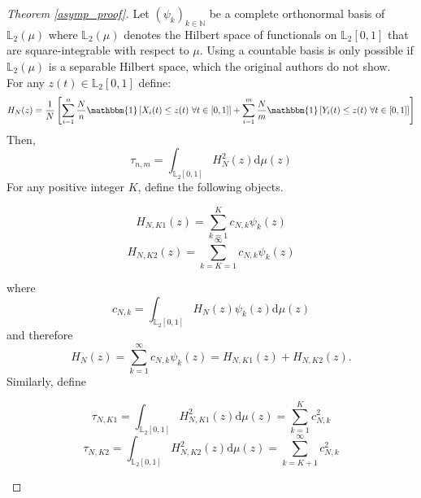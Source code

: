\documentclass[12pt, a4paper]{article}
\theoremstyle{MAstyle} \newtheorem{assumption}{Assumption}[section]
\theoremstyle{MAstyle} \newtheorem{definition}{Definition}[section]
\theoremstyle{MAstyle} \newtheorem{theorem}{Theorem}[section]
\begin{document}
		\begin{proof}[Theorem \ref{asymp_proof}]
			Let $\left(\psi_k\right)_{k \in \mathbb{N}}$ be a complete orthonormal basis of $\mathbb{L}_2(\mu)$ where $\mathbb{L}_2(\mu)$ denotes the Hilbert space of functionals on $\mathbb{L}_2[0,1]$ that are square-integrable with respect to $\mu$. Using a countable basis is only possible if $\mathbb{L}_2(\mu)$ is a separable Hilbert space, which the original authors do not show.\\
			
			For any $z(t) \in \mathbb{L}_2[0,1]$ define:
			\begin{equation}
				H_N(z) = \frac{1}{N} \left[\sum_{i = 1}^{n} \frac{N}{n} \mathbbm{1}\left[X_i(t) \leq z(t)\ \forall t \in [0,1]\right]
				+ \sum_{i = 1}^{m} \frac{N}{m} \mathbbm{1}\left[Y_i(t) \leq z(t)\ \forall t \in [0,1]\right]\right]
			\end{equation} 
			Then,
			\begin{equation}
				\tau_{n,m} = \int_{\mathbb{L}_2[0,1]} H_N^2(z) \mathrm{d}\mu(z)
			\end{equation}
			For any positive integer $K$, define the following objects.
			\begin{multicols}{2}
				\noindent
				\begin{equation*}
					H_{N,K1}(z) = \sum_{k = 1}^{K} c_{N,k}\psi_k(z)
				\end{equation*}
				\begin{equation}
					H_{N,K2}(z) = \sum_{k = K=1}^{\infty} c_{N,k}\psi_k(z)
				\end{equation}
			\end{multicols}
			where
			\begin{equation}
				c_{N,k} = \int_{\mathbb{L}_2[0,1]} H_N(z) \psi_k(z) \mathrm{d}\mu(z)
			\end{equation}
		and therefore
		\begin{equation}
			H_N(z) = \sum_{k = 1}^{\infty} c_{N,k}\psi_k(z) = H_{N,K1}(z) + H_{N,K2}(z).
		\end{equation}
		Similarly, define
		\begin{multicols}{2}
			\noindent
			\begin{equation*}
				\tau_{N,K1} = \int_{\mathbb{L}_2[0,1]} 	H_{N,K1}^2(z) \mathrm{d}\mu(z) = \sum_{k = 1}^{K} c_{N,k}^2
			\end{equation*}
			\begin{equation}
				\tau_{N,K2} = \int_{\mathbb{L}_2[0,1]} 	H_{N,K2}^2(z) \mathrm{d}\mu(z) = \sum_{k = K+1}^{\infty} c_{N,k}^2
			\end{equation}

\end{multicols}
\end{proof}
\end{document}
